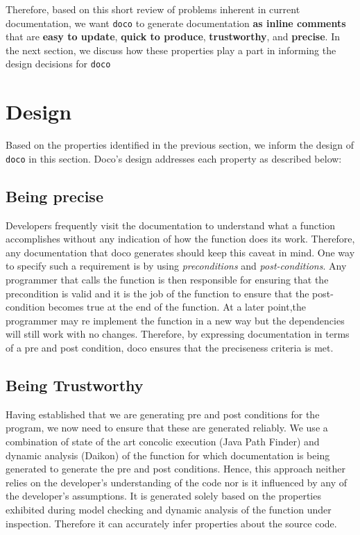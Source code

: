 Therefore, based on this short review of problems inherent in current documentation, we want \texttt{doco} to generate documentation  \textbf{as inline comments} that are \textbf{easy to update}, \textbf{quick to produce}, \textbf{trustworthy},  and \textbf{precise}. In the next section, we discuss how these properties play a part in informing the design decisions for \texttt{doco}

\section{Design}

Based on the properties identified in the previous section, we inform the design of \texttt{doco} in this section. Doco's design addresses each property as described below:



    \subsection{Being precise} Developers frequently visit the documentation to understand what a function accomplishes without any indication of how the function does its work. Therefore, any documentation that doco generates should keep this caveat in mind. One way to specify such a requirement is by using \textit{preconditions} and \textit{post-conditions}. Any programmer that calls the function is then responsible for ensuring that the precondition is valid and it is the job of the function to ensure that the post-condition becomes true at the end of the function. At a later point,the programmer may re implement the function in a new way but the dependencies will still work with no changes. Therefore, by expressing documentation in terms of a pre and post condition, doco ensures that the preciseness criteria is met.  
    

    
    \subsection{Being Trustworthy} Having established that we are generating pre and post conditions for the program, we now need to ensure that these are generated reliably. We use a combination of state of the art concolic execution (Java Path Finder) and dynamic analysis (Daikon) \cite{Ernst:2007} of the function for which documentation is being generated to generate the pre and post conditions. Hence, this approach neither relies on the developer's understanding of the code nor is it influenced by any of the developer's assumptions. It is generated solely based on the properties exhibited during model checking and dynamic analysis of the function under inspection. Therefore it can accurately infer properties about the source code.
    
